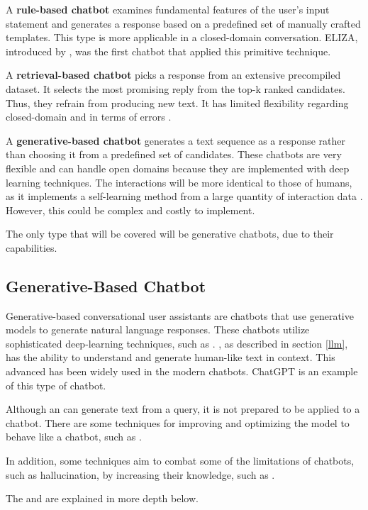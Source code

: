 A \textbf{rule-based chatbot} examines fundamental features of the user's input statement and generates a response based on a predefined set of manually crafted templates. This type is more applicable in a closed-domain conversation. ELIZA, introduced by \citet{weizenbaum_elizacomputer_1966}, was the first chatbot that applied this primitive technique.

A \textbf{retrieval-based chatbot} picks a response from an extensive precompiled dataset. It selects the most promising reply from the top-k ranked candidates. Thus, they refrain from producing new text. It has limited flexibility regarding closed-domain and in terms of errors \cite{agarwal_review_2020}.

A \textbf{generative-based chatbot} generates a text sequence as a response rather than choosing it from a predefined set of candidates. These chatbots are very flexible and can handle open domains because they are implemented with deep learning techniques. The interactions will be more identical to those of humans, as it implements a self-learning method from a large quantity of interaction data \cite{peng_survey_2019} \cite{agarwal_review_2020}. However, this could be complex and costly to implement.

The only type that will be covered will be generative chatbots, due to their capabilities.


\subsection{Generative-Based Chatbot}

Generative-based conversational user assistants are chatbots that use generative models to generate natural language responses. These chatbots utilize sophisticated deep-learning techniques, such as {\llm}. {\llm}, as described in section \ref{llm}, has the ability to understand and generate human-like text in context. This advanced {\lm} has been widely used in the modern chatbots. ChatGPT is an example of this type of chatbot.

Although an {\llm} can generate text from a query, it is not prepared to be applied to a chatbot. There are some techniques for improving and optimizing the model to behave like a chatbot, such as {\rlhf}.

In addition, some techniques aim to combat some of the limitations of chatbots, such as hallucination, by increasing their knowledge, such as {\rag}.

The {\rlhf} and {\rag} are explained in more depth below.



